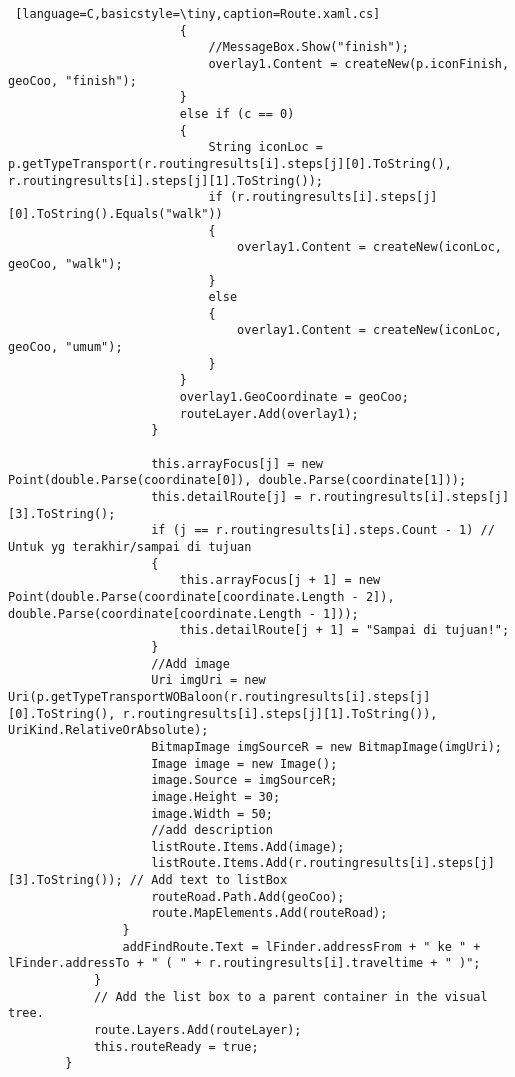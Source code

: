 \begin{lstlisting} [language=C,basicstyle=\tiny,caption=Route.xaml.cs]
                        {
                            //MessageBox.Show("finish");
                            overlay1.Content = createNew(p.iconFinish, geoCoo, "finish");
                        }
                        else if (c == 0)
                        {
                            String iconLoc = p.getTypeTransport(r.routingresults[i].steps[j][0].ToString(), r.routingresults[i].steps[j][1].ToString());
                            if (r.routingresults[i].steps[j][0].ToString().Equals("walk"))
                            {
                                overlay1.Content = createNew(iconLoc, geoCoo, "walk");
                            }
                            else
                            {
                                overlay1.Content = createNew(iconLoc, geoCoo, "umum");
                            }
                        }
                        overlay1.GeoCoordinate = geoCoo;
                        routeLayer.Add(overlay1);
                    }

                    this.arrayFocus[j] = new Point(double.Parse(coordinate[0]), double.Parse(coordinate[1]));
                    this.detailRoute[j] = r.routingresults[i].steps[j][3].ToString();
                    if (j == r.routingresults[i].steps.Count - 1) // Untuk yg terakhir/sampai di tujuan
                    {
                        this.arrayFocus[j + 1] = new Point(double.Parse(coordinate[coordinate.Length - 2]), double.Parse(coordinate[coordinate.Length - 1]));
                        this.detailRoute[j + 1] = "Sampai di tujuan!";
                    }
                    //Add image 
                    Uri imgUri = new Uri(p.getTypeTransportWOBaloon(r.routingresults[i].steps[j][0].ToString(), r.routingresults[i].steps[j][1].ToString()), UriKind.RelativeOrAbsolute);
                    BitmapImage imgSourceR = new BitmapImage(imgUri);
                    Image image = new Image();
                    image.Source = imgSourceR;
                    image.Height = 30;
                    image.Width = 50;
                    //add description
                    listRoute.Items.Add(image);
                    listRoute.Items.Add(r.routingresults[i].steps[j][3].ToString()); // Add text to listBox
                    routeRoad.Path.Add(geoCoo);
                    route.MapElements.Add(routeRoad);
                }
                addFindRoute.Text = lFinder.addressFrom + " ke " + lFinder.addressTo + " ( " + r.routingresults[i].traveltime + " )";
            }
            // Add the list box to a parent container in the visual tree.
            route.Layers.Add(routeLayer);
            this.routeReady = true;
        }


\end{lstlisting}
